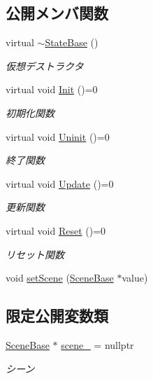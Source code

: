 \subsection*{公開メンバ関数}
\begin{DoxyCompactItemize}
\item 
virtual \mbox{\hyperlink{class_scene_base_1_1_state_base_afc993757f908babc872063e1e2465e3e}{$\sim$\+State\+Base}} ()
\begin{DoxyCompactList}\small\item\em 仮想デストラクタ \end{DoxyCompactList}\item 
virtual void \mbox{\hyperlink{class_scene_base_1_1_state_base_a33350231b039a2178c19beac0211c5b8}{Init}} ()=0
\begin{DoxyCompactList}\small\item\em 初期化関数 \end{DoxyCompactList}\item 
virtual void \mbox{\hyperlink{class_scene_base_1_1_state_base_a2763fa37e45b39bd8d3bbb735c76c59b}{Uninit}} ()=0
\begin{DoxyCompactList}\small\item\em 終了関数 \end{DoxyCompactList}\item 
virtual void \mbox{\hyperlink{class_scene_base_1_1_state_base_ad2c6c8fd9f020eb02f64f394edee129c}{Update}} ()=0
\begin{DoxyCompactList}\small\item\em 更新関数 \end{DoxyCompactList}\item 
virtual void \mbox{\hyperlink{class_scene_base_1_1_state_base_a2e14a3afece0b1d8db9edcebf514a977}{Reset}} ()=0
\begin{DoxyCompactList}\small\item\em リセット関数 \end{DoxyCompactList}\item 
void \mbox{\hyperlink{class_scene_base_1_1_state_base_adfb19da59b938832387aa10528bedb44}{set\+Scene}} (\mbox{\hyperlink{class_scene_base}{Scene\+Base}} $\ast$value)
\end{DoxyCompactItemize}
\subsection*{限定公開変数類}
\begin{DoxyCompactItemize}
\item 
\mbox{\hyperlink{class_scene_base}{Scene\+Base}} $\ast$ \mbox{\hyperlink{class_scene_base_1_1_state_base_ae1062afb3f96664e24504151eaccf40f}{scene\+\_\+}} = nullptr
\begin{DoxyCompactList}\small\item\em シーン \end{DoxyCompactList}\end{DoxyCompactItemize}


